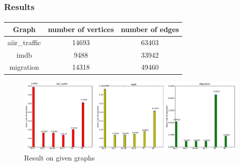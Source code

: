 \begin{frame}
\frametitle{Results}
\framesubtitle{}
\begin{center}
\begin{tabular}{|c|c|c|}
\hline
Graph & number of vertices & number of edges \\
\hline
aiir\_traffic & 14693 & 63403\\
imdb & 9488 & 33942\\
migration & 14318 & 49460\\
\hline
\end{tabular}
\end{center}

\begin{exampleblock}{}
\begin{figure}[!h]
\centering
\includegraphics[width=\textwidth]{../rapport/img/histogramme.png}
\caption{Result on given graphs}
\end{figure}
\end{exampleblock}{}
\end{frame}


